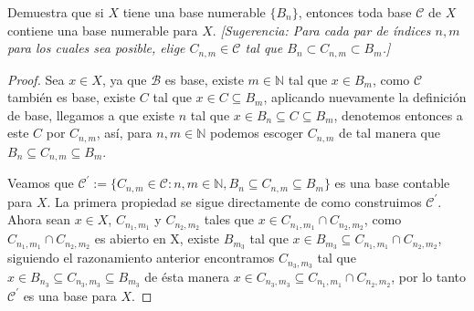 
\item Demuestra que si $X$ tiene una base numerable $\{B_n\}$, entonces toda base $\mathcal{C}$ de $X$ contiene una base numerable para $X$. \textit{[Sugerencia: Para cada par de índices $n,m$ para los cuales sea posible, elige $C_{n,m} \in \mathcal{C}$ tal que $B_n \subset C_{n,m} \subset B_m$.]}

\begin{proof}
    Sea $x \in X$, ya que $\mathcal{B}$ es base, existe $m \in \mathbb{N}$ tal que $x \in B_m$, como $\mathcal{C}$ también es base, existe $C$ tal que $x \in C \subseteq B_m$, aplicando nuevamente la definición de base, llegamos a que existe $n$ tal que $x \in B_n \subseteq C \subseteq B_m$, denotemos entonces a este $C$ por $C_{n,m}$, así, para $n, m \in \mathbb{N}$ podemos escoger $C_{n,m}$ de tal manera que $B_n \subseteq C_{n,m} \subseteq B_m$.  

    Veamos que $\mathcal{C}^\prime := \{C_{n,m} \in \mathcal{C} : n,m \in \mathbb{N}, B_n \subseteq C_{n,m} \subseteq B_m\}$ es una base contable para $X$. La primera propiedad se sigue directamente de como construimos $\mathcal{C}^\prime$. Ahora sean $x \in X$, $C_{n_1,m_1}$ y $C_{n_2,m_2}$ tales que $x \in C_{n_1,m_1} \cap C_{n_2,m_2}$, como $C_{n_1,m_1} \cap C_{n_2,m_2}$ es abierto en X, existe $B_{m_3}$ tal que $x \in B_{m_3} \subseteq  C_{n_1,m_1} \cap C_{n_2,m_2}$, siguiendo el razonamiento anterior encontramos $C_{n_3,m_3}$ tal que $x \in B_{n_3} \subseteq C_{n_3,m_3} \subseteq B_{m_3}$ de ésta manera $x \in C_{n_3,m_3} \subseteq  C_{n_1,m_1} \cap C_{n_2,m_2}$, por lo tanto $\mathcal{C}^\prime$ es una base para $X$.
    
\end{proof}